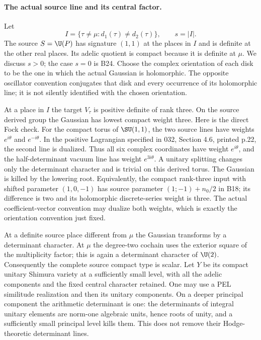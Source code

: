\documentclass[11pt]{article}
\theoremstyle{definition}\newtheorem{definition}[theorem]{Definition}\newtheorem{remark}[theorem]{Remark}
\begin{document}
\paragraph{The actual source line and its central factor.}
Let
\[
 I=\{\tau\ne\mu:d_1(\tau)\ne d_2(\tau)\},\qquad s=|I|.
 \tag{B26a}
\]
The source $S=\U(P)$ has signature $(1,1)$ at the places in $I$
and is definite at the other real places.  Its adelic quotient
is compact because it is definite at $\mu$.  We discuss $s>0$;
the case $s=0$ is B24.  Choose the complex orientation of each
disk to be the one in which the actual Gaussian is holomorphic.
The opposite oscillator convention conjugates that disk and
every occurrence of its holomorphic line; it is not silently
identified with the chosen orientation.

At a place in $I$ the target $V_\tau$ is positive definite of
rank three.  On the source derived group the Gaussian has
lowest compact weight three.  Here is the direct Fock check.
For the compact torus of $\SU(1,1)$, the two source lines have
weights $e^{i\theta}$ and $e^{-i\theta}$.  In the positive
Lagrangian specified in 032, Section 4.6, printed p.22, the
second line is dualized.  Thus all six complex coordinates have
weight $e^{i\theta}$, and the half-determinant vacuum line has
weight $e^{3i\theta}$.  A unitary splitting changes only the
determinant character and is trivial on this derived torus.
The Gaussian is killed by the lowering root.  Equivalently,
the compact rank-three input with shifted parameter $(1,0,-1)$
has source parameter $(1;-1)+n_0/2$ in B18; its difference is
two and its holomorphic discrete-series weight is three.
The actual coefficient-vector convention may dualize both
weights, which is exactly the orientation convention just fixed.

At a definite source place different from $\mu$ the Gaussian
transforms by a determinant character.  At $\mu$ the degree-two
cochain uses the exterior square of the multiplicity factor;
this is again a determinant character of $\U(2)$.  Consequently
the complete source compact type is scalar.  Let $Y$ be its
compact unitary Shimura variety at a sufficiently small level,
with all the adelic components and the fixed central character
retained.  One may use a PEL similitude realization and then its
unitary components.  On a deeper principal component the
arithmetic determinant is one: the determinants of integral
unitary elements are norm-one algebraic units, hence roots of
unity, and a sufficiently small principal level kills them.
This does not remove their Hodge-theoretic determinant lines.
\end{document}
